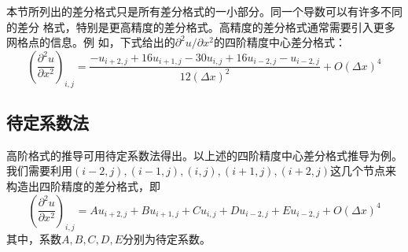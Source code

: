 本节所列出的差分格式只是所有差分格式的一小部分。同一个导数可以有许多不同的差分
格式，特别是更高精度的差分格式。高精度的差分格式通常需要引入更多网格点的信息。例
如，下式给出的$\partial^{2} u/\partial x^{2}$的四阶精度中心差分格式：
\begin{equation}
  \left(
    \frac{\partial^{2} u}{\partial x^{2}}
  \right)_{i,j}
  =
  \frac{-u_{i+2,j}+16u_{i+1,j}-30u_{i,j}+16u_{i-2,j}-u_{i-2,j}}{12(\Delta x)^{2}}
  +
  O(\Delta x)^{4}
\end{equation}

\subsection{待定系数法}
高阶格式的推导可用待定系数法得出。以上述的四阶精度中心差分格式推导为例。
我们需要利用$(i-2,j), (i-1,j), (i,j), (i+1,j),
(i+2,j)$这几个节点来构造出四阶精度的差分格式，即
\begin{equation}
  \left(
    \frac{\partial^{2} u}{\partial x^{2}}
  \right)_{i,j}
  =
  Au_{i+2,j}+Bu_{i+1,j}+Cu_{i,j}+Du_{i-2,j}+Eu_{i-2,j}
  +
  O(\Delta x)^{4}
\end{equation}
其中，系数$A, B, C, D, E$分别为待定系数。

